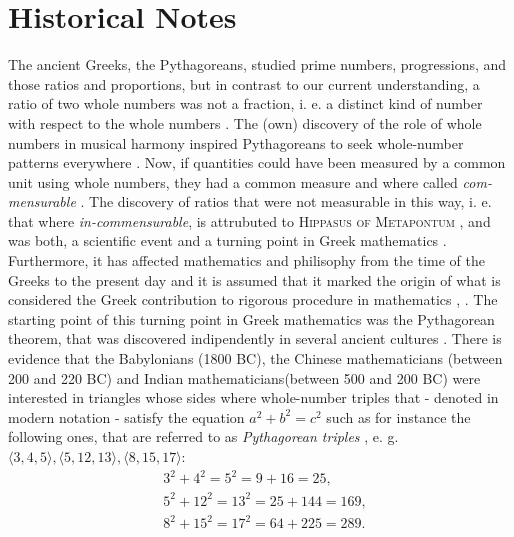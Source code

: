 \documentclass[11pt]{amsart}
\theoremstyle{definition}
\begin{document}
\section{Historical Notes}
The ancient Greeks, the Pythagoreans, studied prime numbers, progressions, and those ratios and proportions, but in contrast to our current understanding, a ratio of two whole numbers was not a fraction, i. e. a distinct kind of number with respect to the whole numbers \cite[32]{klineMathematicalThoughtAncient1990}.
The (own) discovery of the role of whole numbers in musical harmony inspired Pythagoreans to seek whole-number patterns everywhere \cite[11]{stillwellMathematicsItsHistory2010}.
Now, if quantities could have been measured by a common unit using whole numbers, they had a common measure and where called \emph{com-mensurable} \cite[32]{klineMathematicalThoughtAncient1990}.
The discovery of ratios that were not measurable in this way, i. e. that where \emph{in-commensurable}, is attrubuted to \textsc{Hippasus of Metapontum} \cite[32]{klineMathematicalThoughtAncient1990}, and was both, a scientific event \cite[59]{courantWhatMathematicsElementary1996} and a turning point in Greek mathematics \cite[1]{stillwellStoryProofLogic2022}. Furthermore, it has affected mathematics and philisophy from the time of the Greeks to the present day \cite[59-60]{courantWhatMathematicsElementary1996} and it is assumed that it marked the origin of what is considered the Greek contribution to rigorous procedure in mathematics \cite[59]{courantWhatMathematicsElementary1996}, \cite[1]{stillwellStoryProofLogic2022}.
The starting point of this turning point in Greek mathematics was the Pythagorean theorem, that was discovered indipendently in several ancient cultures \cite[3]{stillwellStoryProofLogic2022}.
There is evidence \cite[4]{stillwellMathematicsItsHistory2010} that the Babylonians (1800 BC), the Chinese mathematicians (between 200 and 220 BC) and Indian mathematicians(between 500 and 200 BC) were interested in triangles whose sides where whole-number triples that - denoted in modern notation - satisfy the equation \(a^{2} + b^{2} = c^{2}\) \cite[3-4]{stillwellStoryProofLogic2022} such as for instance the following ones, that are referred to as \emph{Pythagorean triples} \cite[4]{stillwellMathematicsItsHistory2010}, e. g. \(\langle 3, 4, 5 \rangle, \langle 5, 12, 13 \rangle, \langle 8, 15, 17 \rangle\):
\begin{align*}
     & 3^{2} + 4^{2}  =  5^{2}  = 9 + 16 = 25,     \\
     & 5^{2} + 12^{2} =  13^{2}  = 25 + 144 = 169, \\
     & 8^{2} + 15^{2} = 17^{2} = 64 + 225 = 289.
\end{align*}
\end{document}
